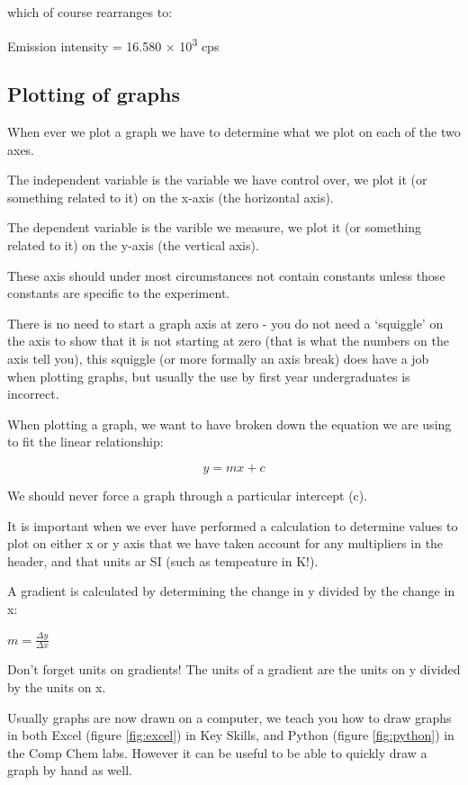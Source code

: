 \documentclass[
]{book}
\begin{document}
which of course rearranges to:

Emission intensity = 16.580 × 10\textsuperscript{3} cps

\hypertarget{subsec:plotting}{%
\subsection{Plotting of graphs}\label{subsec:plotting}}

When ever we plot a graph we have to determine what we plot on each of the two axes.

The independent variable is the variable we have control over, we plot it (or something related to it) on the x-axis (the horizontal axis).

The dependent variable is the varible we measure, we plot it (or something related to it) on the y-axis (the vertical axis).

These axis should under most circumstances not contain constants unless those constants are specific to the experiment.

There is no need to start a graph axis at zero - you do not need a `squiggle' on the axis to show that it is not starting at zero (that is what the numbers on the axis tell you), this squiggle (or more formally an axis break) does have a job when plotting graphs, but usually the use by first year undergraduates is incorrect.

When plotting a graph, we want to have broken down the equation we are using to fit the linear relationship:

\begin{equation}
y = mx+c
\label{eq:linearplot}
\end{equation}

We should never force a graph through a particular intercept (c).

It is important when we ever have performed a calculation to determine values to plot on either x or y axis that we have taken account for any multipliers in the header, and that units ar SI (such as tempeature in K!).

A gradient is calculated by determining the change in y divided by the change in x:

\(m= \frac{\Delta y}{\Delta x}\)

Don't forget units on gradients! The units of a gradient are the units on y divided by the units on x.

Usually graphs are now drawn on a computer, we teach you how to draw graphs in both Excel (figure \ref{fig:excel}) in Key Skills, and Python (figure \ref{fig:python}) in the Comp Chem labs. However it can be useful to be able to quickly draw a graph by hand as well.
\end{document}
